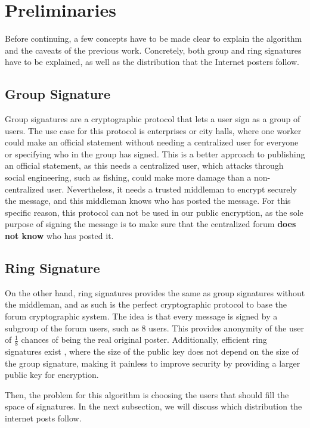 \documentclass[11pt,congress]{ieeetran}
\begin{document}
\section{Preliminaries}
\label{sec:orgc6e8a58}
Before continuing, a few concepts have to be made clear to explain the algorithm and the caveats of the
previous work. Concretely, both group and ring signatures have to be explained, as well as the distribution that the Internet posters follow.

\subsection{Group Signature}
\label{sec:org8b94944}
Group signatures \cite{group} are a cryptographic protocol that lets a user sign as a group of users. The
use case for this protocol is enterprises or city halls, where one worker could make an official statement
without needing a centralized user for everyone or specifying who in the group has signed. This is a better
approach to publishing an official statement, as this needs a centralized user, which attacks through social engineering, such as fishing, could make more damage than a non-centralized user. Nevertheless, it needs a trusted middleman to encrypt securely the message, and this middleman knows who has posted the message. For this specific reason, this protocol can not be used in our public encryption, as the sole purpose of signing the message is to make sure that the centralized forum \textbf{does not know} who has posted it.

\subsection{Ring Signature}
\label{sec:orgd2e2b3b}
On the other hand, ring signatures \cite{ring} provides the same as group signatures without the middleman, and as such is the perfect cryptographic protocol to base the forum cryptographic system. The idea is that every message is signed by a subgroup of the forum users, such as 8 users. This provides anonymity of the user of \(\frac{1}{8}\) chances of being the real original poster. Additionally, efficient ring signatures exist \cite{ring-rsa}, where the size of the public key does not depend on the size of the group signature, making it painless to improve security by providing a larger public key for encryption.

Then, the problem for this algorithm is choosing the users that should fill the space of signatures. In the next subsection, we will discuss which distribution the internet posts follow.
\end{document}
